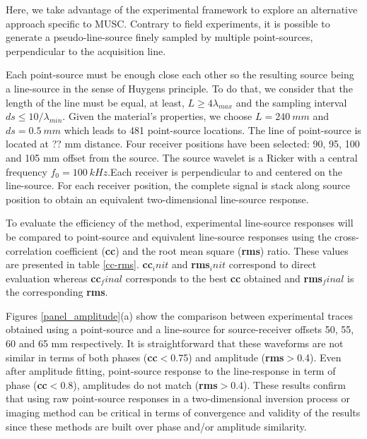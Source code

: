 \documentclass[manuscript,revised]{geophysics}
\newcommand{\twod}{two-dimensional }
\begin{document}
\noindent Here, we take advantage of the experimental framework to explore an alternative approach specific to MUSC. Contrary to field experiments, it is possible to generate a pseudo-line-source finely sampled by multiple point-sources, perpendicular to the acquisition line. 

\noindent Each point-source must be enough close each other so the resulting source being a line-source in the sense of Huygens principle. To do that, we consider that the length of the line must be equal, at least, $L \geq 4\lambda_{max}$ and the sampling interval $ds \leq 10 / \lambda_{min}$. Given the material's properties, we choose $L=240\ mm$ and $ds=0.5\ mm$ which leads to 481 point-source locations. The line of point-source is located at ?? mm distance. Four receiver positions have been selected: 90, 95, 100 and 105 mm offset from the source. The source wavelet is a Ricker with a central frequency $f_{0}=100\ kHz$.Each receiver is perpendicular to and centered on the line-source. For each receiver position, the complete signal is stack along source position to obtain an equivalent \twod line-source response.

\noindent To evaluate the efficiency of the method, experimental line-source responses will be compared to point-source and equivalent line-source responses using the cross-correlation coefficient (\textbf{cc}) and the root mean square (\textbf{rms}) ratio. These values are presented in table \ref{cc-rms}. \textbf{cc}$_init$ and \textbf{rms}$_init$ correspond to direct evaluation whereas \textbf{cc}$_final$ corresponds to the best \textbf{cc} obtained and \textbf{rms}$_final$ is the corresponding \textbf{rms}.

\noindent Figures \ref{panel_amplitude}(a) show the comparison between experimental traces obtained using a point-source and a line-source for source-receiver offsets 50, 55, 60 and 65 mm respectively. It is straightforward that these waveforms are not similar in terms of both phases (\textbf{cc}$<$0.75) and amplitude (\textbf{rms}$>$0.4). Even after amplitude fitting, point-source response to the line-response in term of phase (\textbf{cc}$<$0.8), amplitudes do not match (\textbf{rms}$>$0.4). These results confirm that using raw point-source responses in a \twod inversion process or imaging method can be critical in terms of convergence and validity of the results since these methods are built over phase and/or amplitude similarity.
\end{document}
